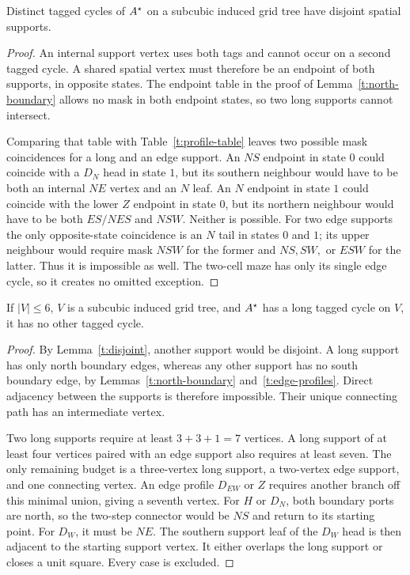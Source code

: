 \begin{lemma}\label{t:disjoint}
Distinct tagged cycles of \(A^{\star}\) on a subcubic induced grid tree have
disjoint spatial supports.
\end{lemma}
\begin{proof}
An internal support vertex uses both tags and cannot occur on a second
tagged cycle. A shared spatial vertex must therefore be an endpoint of
both supports, in opposite states. The endpoint table in the proof of
Lemma~\ref{t:north-boundary} allows no mask in both endpoint states, so
two long supports cannot intersect.

Comparing that table with Table~\ref{t:profile-table} leaves two possible
mask coincidences for a long and an edge support. An \(NS\) endpoint in
state \(0\) could coincide with a \(D_N\) head in state \(1\), but its
southern neighbour would have to be both an internal \(NE\) vertex and
an \(N\) leaf. An \(N\) endpoint in state \(1\) could coincide with the
lower \(Z\) endpoint in state \(0\), but its northern neighbour would
have to be both \(ES/NES\) and \(NSW\). Neither is possible.
For two edge supports the only opposite-state coincidence is an \(N\)
tail in states \(0\) and \(1\); its upper neighbour would require mask
\(NSW\) for the former and \(NS,SW,\) or \(ESW\) for the latter.
Thus it is impossible as well. The two-cell maze has only its single
edge cycle, so it creates no omitted exception.
\end{proof}

\begin{lemma}\label{t:long-unique}
If \(|V|\le6\), \(V\) is a subcubic induced grid tree, and \(A^{\star}\)
has a long tagged cycle on \(V\), it has no other tagged cycle.
\end{lemma}
\begin{proof}
By Lemma~\ref{t:disjoint}, another support would be disjoint. A long
support has only north boundary edges, whereas any other support has
no south boundary edge, by Lemmas~\ref{t:north-boundary}
and~\ref{t:edge-profiles}. Direct adjacency between the supports is
therefore impossible. Their unique connecting path has an intermediate
vertex.

Two long supports require at least \(3+3+1=7\) vertices. A long support
of at least four vertices paired with an edge support also requires
at least seven. The only remaining budget is a three-vertex long
support, a two-vertex edge support, and one connecting vertex.
An edge profile \(D_{EW}\) or \(Z\) requires another branch off this
minimal union, giving a seventh vertex. For \(H\) or \(D_N\), both
boundary ports are north, so the two-step connector would be \(NS\)
and return to its starting point. For \(D_W\), it must be \(NE\).
The southern support leaf of the \(D_W\) head is then adjacent to the
starting support vertex. It either overlaps the long support or closes
a unit square. Every case is excluded.
\end{proof}

